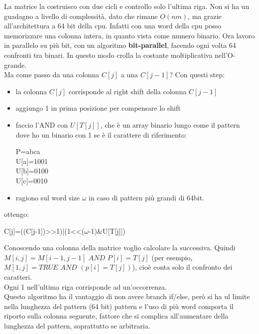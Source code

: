 \documentclass[a4paper,12pt, oneside]{book}
\begin{document}
La matrice la costruisco con due cicli e controllo solo l'ultima riga.
Non si ha un guadagno a livello di complessità, dato che rimane
$O(nm)$, ma grazie all'architettura a 64 bit della cpu. Infatti con una word
della cpu posso memorizzare una colonna intera, in quanto vista come numero
binario. Ora lavoro in parallelo su più bit, con un algoritmo
\textbf{bit-parallel}, facendo ogni volta 64 confronti tra binari. In
questo modo crolla la costante moltiplicativa nell'O-grande.\\
Ma come passo da una colonna $C[j]$ a una $C[j-1]$? Con questi step:
\begin{itemize}
  \item la colonna $C[j]$ corrisponde al right shift della colonna $C[j-1]$
  \item aggiungo 1 in prima posizione per compensare lo shift
  \item faccio l'AND con $U[T[j]]$, che è un array binario lungo come
  il pattern dove ho un binario con 1 se è il carattere  di
  riferimento:
  \begin{center}
    P=abca\\
    U[a]=1001\\
    U[b]=0100\\
    U[c]=0010\\
  \end{center}
  \item ragiono sul word size $\omega$ in caso di pattern più grandi
  di 64bit.
\end{itemize}
ottengo:
\begin{center}
 C[j]=((C[j-1])>>1)|(1<<($\omega$-1)\&U[T[j]])
\end{center}
Conoscendo una colonna della matrice voglio calcolare la successiva. 
Quindi $M[i,j]=M[i-1,j-1]\,\,AND\,\,P[i]=T[j]$ (per esempio, 
$M[1,j]=TRUE\,\,AND\,\,(p[i]=T[j])$), cioè conta solo il
confronto dei caratteri. \\
Ogni 1 nell'ultima riga corrisponde ad un'occorrenza. \\ 
Questo algoritmo ha il vantaggio di non avere branch if/else, 
però si ha ul limite nella lunghezza del pattern (64 bit) pattern 
e l'uso di più word comporta il riporto sulla colonna
seguente, fattore che si complica all'aumentare della lunghezza del
pattern, soprattutto se arbitraria.
\end{document}
